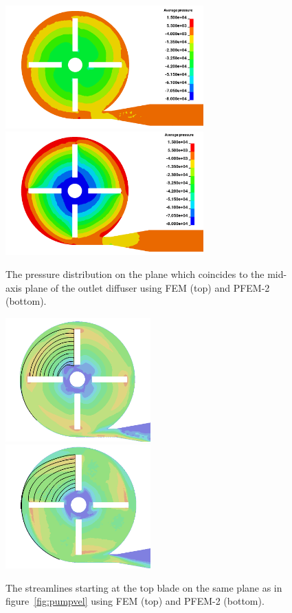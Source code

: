 \begin{figure}[htbp]
    \centering
    \includegraphics[width=3in]{imgs/nozzle_pump/pumppres_fem.png}\\
    \vspace{.5cm}
    \includegraphics[width=3in]{imgs/nozzle_pump/pumppres_pfem.png}
    \caption{The pressure distribution on the plane which coincides to the mid-axis plane of the outlet diffuser using FEM (top) and PFEM-2 (bottom).}
    \label{fig:pumppres}
\end{figure}

\begin{figure}[htbp]
    \centering
    \includegraphics[width=2.2in]{imgs/nozzle_pump/pump_sl_fem.png}\\
    \vspace{.5cm}
    \includegraphics[width=2.2in]{imgs/nozzle_pump/pump_sl_pfem.png}
    \caption{The streamlines starting at the top blade on the same plane as in figure~\ref{fig:pumpvel} using FEM (top) and PFEM-2 (bottom).}
    \label{fig:pumpsl}
\end{figure}

